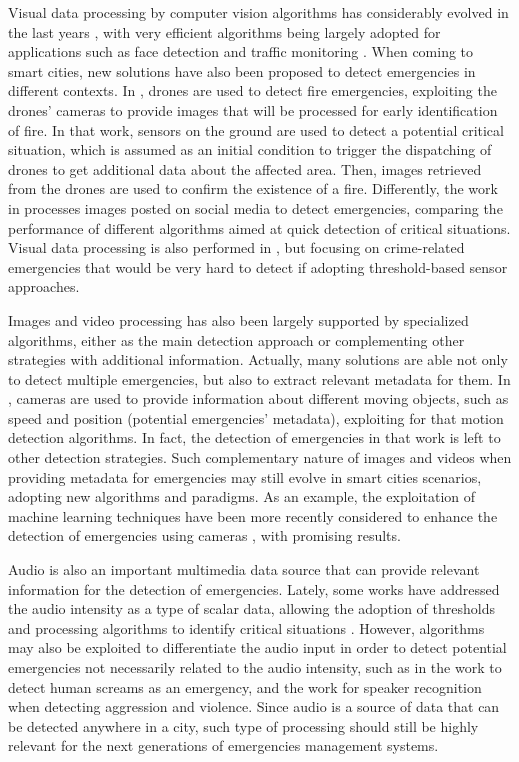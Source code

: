 \begin{refsection}
Visual data processing by computer vision algorithms has considerably evolved in the last years \cite{computerVision1}, with very efficient algorithms being largely adopted for applications such as face detection \cite{facerecognition} and traffic monitoring \cite{camerastraffic}. When coming to smart cities, new solutions have also been proposed to detect emergencies in different contexts. In \cite{visualdataEmergency1}, drones are used to detect fire emergencies, exploiting the drones' cameras to provide images that will be processed for early identification of fire. In that work, sensors on the ground are used to detect a potential critical situation, which is assumed as an initial condition to trigger the dispatching of drones to get additional data about the affected area. Then, images retrieved from the drones are used to confirm the existence of a fire. Differently, the work in \cite{visualdataEmergency2} processes images posted on social media to detect emergencies, comparing the performance of different algorithms aimed at quick detection of critical situations. Visual data processing is also performed in \cite{visualdataEmergency4}, but focusing on crime-related emergencies that would be very hard to detect if adopting threshold-based sensor approaches.

Images and video processing has also been largely supported by specialized algorithms, either as the main detection approach or complementing other strategies with additional information. Actually, many solutions are able not only to detect multiple emergencies, but also to extract relevant metadata for them. In \cite{visualdataEmergency2}, cameras are used to provide information about different moving objects, such as speed and position (potential emergencies' metadata), exploiting for that motion detection algorithms. In fact, the detection of emergencies in that work is left to other detection strategies. Such complementary nature of images and videos when providing metadata for emergencies may still evolve in smart cities scenarios, adopting new algorithms and paradigms. As an example, the exploitation of machine learning techniques have been more recently considered to enhance the detection of emergencies using cameras \cite{emergenciesmetric3}, with promising results. 

Audio is also an important multimedia data source that can provide relevant information for the detection of emergencies. Lately, some works have addressed the audio intensity as a type of scalar data, allowing the adoption of thresholds and processing algorithms to identify critical situations \cite{iotAudio1,iotAudio2}. However, algorithms may also be exploited to differentiate the audio input in order to detect potential emergencies not necessarily related to the audio intensity, such as in the work \cite{iotAudio3} to detect human screams as an emergency, and the work \cite{iotAudio4} for speaker recognition when detecting aggression and violence. Since audio is a source of data that can be detected anywhere in a city, such type of processing should still be highly relevant for the next generations of emergencies management systems.


\end{refsection}
